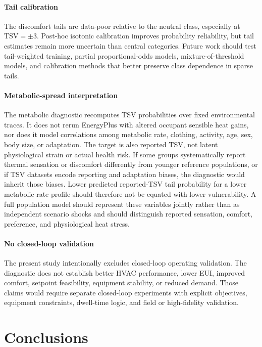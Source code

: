 \paragraph{Tail calibration}
The discomfort tails are data-poor relative to the neutral class, especially at $\mathrm{TSV}=\pm3$. Post-hoc isotonic calibration improves probability reliability, but tail estimates remain more uncertain than central categories. Future work should test tail-weighted training, partial proportional-odds models, mixture-of-threshold models, and calibration methods that better preserve class dependence in sparse tails.

\paragraph{Metabolic-spread interpretation}
The metabolic diagnostic recomputes TSV probabilities over fixed environmental traces. It does not rerun EnergyPlus with altered occupant sensible heat gains, nor does it model correlations among metabolic rate, clothing, activity, age, sex, body size, or adaptation. The target is also reported TSV, not latent physiological strain or actual health risk. If some groups systematically report thermal sensation or discomfort differently from younger reference populations, or if TSV datasets encode reporting and adaptation biases, the diagnostic would inherit those biases. Lower predicted reported-TSV tail probability for a lower metabolic-rate profile should therefore not be equated with lower vulnerability. A full population model should represent these variables jointly rather than as independent scenario shocks and should distinguish reported sensation, comfort, preference, and physiological heat stress.

\paragraph{No closed-loop validation}
The present study intentionally excludes closed-loop operating validation. The diagnostic does not establish better HVAC performance, lower EUI, improved comfort, setpoint feasibility, equipment stability, or reduced demand. Those claims would require separate closed-loop experiments with explicit objectives, equipment constraints, dwell-time logic, and field or high-fidelity validation.

\section{Conclusions}

